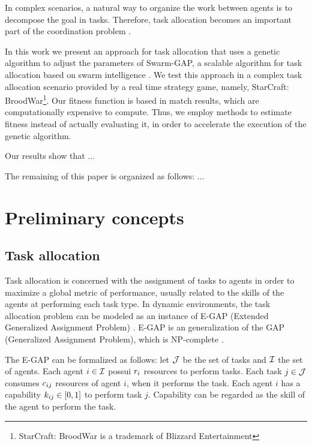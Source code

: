 \documentclass[conference]{IEEEtran}
\begin{document}
In complex scenarios, a natural way to organize the work between agents is to decompose the goal in tasks. Therefore, task allocation becomes an important part of the coordination problem \cite{Ferreira+2008ccmms}. 

In this work we present an approach for task allocation that uses a genetic algorithm to adjust the parameters of Swarm-GAP, a scalable algorithm for task allocation based on swarm intelligence \cite{Ferreira+2008ccmms}. We test this approach in a complex task allocation scenario provided by a real time strategy game, namely, StarCraft: BroodWar\footnote{StarCraft: BroodWar is a trademark of Blizzard Entertainment}. Our fitness function is based in match results, which are computationally expensive to compute. Thus, we employ methods to estimate fitness instead of actually evaluating it, in order to accelerate the execution of the genetic algorithm.

Our results show that ...

The remaining of this paper is organized as follows: ...

\section{Preliminary concepts}
\label{sec:concepts}


\subsection{Task allocation}
\label{sec:ta}

Task allocation is concerned with the assignment of tasks to agents in order to maximize a global metric of performance, usually related to the skills of the agents at performing each task type. In dynamic environments, the task allocation problem can be modeled as an instance of E-GAP (Extended Generalized Assignment Problem) \cite{Scerri+2005}. E-GAP is an generalization of the GAP (Generalized Assignment Problem), which is NP-complete \cite{Shmoys&Tardos1993}. 

The E-GAP can be formalized as follows: let $\mathcal{J}$ be the set of tasks and $\mathcal{I}$ the set of agents. Each agent $i \in \mathcal{I}$ possui $r_{i}$ resources to perform tasks. Each task $j \in \mathcal{J}$ consumes $c_{ij}$ resources of agent $i$, when it performs the task. Each agent $i$ has a capability $k_{ij} \in [0,1]$ to perform task $j$. Capability can be regarded as the skill of the agent to perform the task. %
\end{document}
